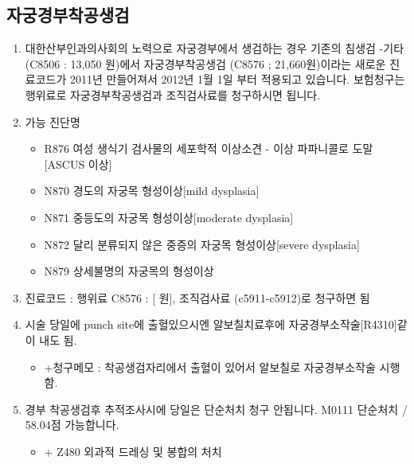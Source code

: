 \subsection{자궁경부착공생검}
\begin{enumerate}\tightlist
\item 대한산부인과의사회의 노력으로 자궁경부에서 생검하는 경우 기존의 침생검 -기타 (C8506 : 13,050 원)에서 자궁경부착공생검 (C8576 ; 21,660원)이라는 새로운 진료코드가 2011년 만들어져서 2012년 1월 1일 부터 적용되고 있습니다. 보험청구는 행위료로 자궁경부착공생검과 조직검사료를 청구하시면 됩니다.
\item 가능 진단명
	\begin{itemize}\tightlist
	\item R876 여성 생식기 검사물의 세포학적 이상소견 - 이상 파파니콜로 도말[ASCUS 이상]
	\item N870 경도의 자궁목 형성이상[mild dysplasia]
	\item N871 중등도의 자궁목 형성이상[moderate dysplasia]
	\item N872 달리 분류되지 않은 중증의 자궁목 형성이상[severe dysplasia]
	\item N879 상세불명의 자궁목의 형성이상
	\end{itemize}
\item 진료코드 : 행위료 C8576 : [ 원], 조직검사료 (c5911-c5912)로 청구하면 됨
\item 시술 당일에 punch site에 출혈있으시엔 알보칠치료후에 자궁경부소작술[R4310]같이 내도 됨.
	\begin{itemize}\tightlist
	\item +청구메모 : 착공생검자리에서 출혈이 있어서 알보칠로 자궁경부소작술 시행함. 
	\end{itemize}
\item 경부 착공생검후 추적조사시에 당일은 단순처치 청구 안됩니다. M0111 단순처치 / 58.04점 가능합니다.
	\begin{itemize}\tightlist
	\item + Z480 외과적 드레싱 및 봉합의 처치
	\end{itemize}
\end{enumerate}
